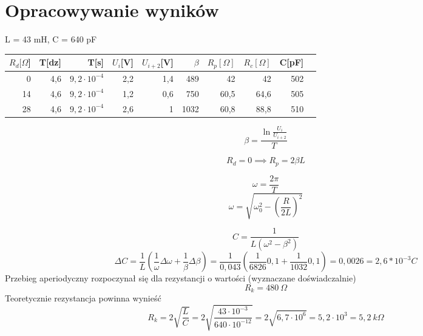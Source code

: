 \documentclass[11pt]{article}
\author{Łukasz Dubiel}
\begin{document}
\section{Opracowywanie wyników}

L = 43 mH, C = 640 pF

\begin{tabular}{|r|r|r|r|r|r|r|r|r|r|}
\hline
	$R_d [\Omega$] & T[dz] & T[s] & $U_i$[V] & $U_{i+2}$[V] & $\beta$ & $R_p[\Omega]$ & $R_c[\Omega]$ & C[pF] \\  
\hline
	0 & 4,6 & $9,2 \cdot 10^{-4}$
	 & 2,2 & 1,4 & 489 & 42 & 42 & 502\\
	 
	14 & 4,6 & $9,2 \cdot 10^{-4}$
	 & 1,2 & 0,6 & 750 & 60,5 & 64,6 & 505\\
	 
	28 & 4,6 & $9,2 \cdot 10^{-4}$
	 & 2,6 & 1 & 1032 & 60,8 & 88,8 & 510\\
\hline
\end{tabular}

\begin{multicols}{2}

$$ \beta = \frac{\ln{\frac{U_i}{U_{i+2}}}}{T} $$

$$ R_d = 0 \implies  R_p = 2\beta L$$

$$ \omega = \frac{2\pi}{T} $$
$$ \omega = \sqrt{\omega_0^2 - \left( \frac{R}{2L} \right)^2} $$
\end{multicols}
$$ C = \frac{1}{L( \omega^2 - \beta^2)} $$
$$ \Delta C = \frac{1}{L}\left(\frac{1}{\omega}\Delta \omega + \frac{1}{\beta}\Delta \beta \right) = \frac{1}{0,043}(\frac{1}{6826}0,1 + \frac{1}{1032}0,1) = 0,0026 = 2,6*10^{-3} C $$
\bigskip
Przebieg aperiodyczny rozpoczynał się dla rezystancji o wartości (wyznaczane doświadczalnie)
$$ R_k = 480 \ \Omega $$
Teoretycznie rezystancja powinna wynieść
$$ R_k = 2 \sqrt{\frac{L}{C}} = 2 \sqrt{\frac{43 \cdot 10^{-3}}{640 \cdot 10^{-12}}} = 2\sqrt{6,7 \cdot 10^{6}} =  5,2 \cdot 10^{3} = 5,2\ k\Omega $$
\end{document}
